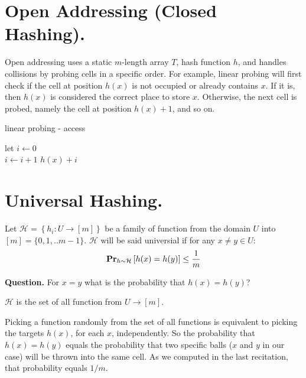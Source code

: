 \section{ Open Addressing (Closed Hashing).}
Open addressing uses a static $m$-length array $T$, hash function $h$, and handles collisions by probing cells in a specific order. For example, linear probing will first check if the cell at position $h(x)$ is not occupied or already contains $x$. If it is, then $h(x)$ is considered the correct place to store $x$. Otherwise, the next cell is probed, namely the cell at position $h(x)+1$, and so on.
  \begin{algorithm}
  \caption{linear probing - access}
  let $i \leftarrow 0 $ \\ 
   {
    $i \leftarrow i +1 $
  }
  \Return $h(x) + i$
  \end{algorithm}

\section{ Universal Hashing. } 



\begin{definition}
  Let $\mathcal{H} = \left\{ h_{i} : U \rightarrow [m] \right\}$ be a  family of function from the domain $U$ into $[m] = \{0, 1, .. m-1\} $. $\mathcal{H}$ will be said universial if for any $x\neq y \in U$: \begin{equation*}
    \begin{split}
      \prbm{h(x) = h(y)}{h \sim \mathcal{H}} \le \frac{1}{m}
    \end{split}
  \end{equation*}
\end{definition}
\textbf{Question.} For $x = y$ what is the probability that $h(x) = h(y)$? 

\begin{example}
  $\mathcal{H}$ is the set of all function from $U \rightarrow [m]$.

  Picking a function randomly from the set of all functions is equivalent to picking the targets $h(x)$, for each $x$, independently. So the probability that $h(x) = h(y)$ equals the probability that two specific balls ($x$ and $y$ in our case) will be thrown into the same cell. As we computed in the last recitation, that probability equals $1/m$.
\end{example}



